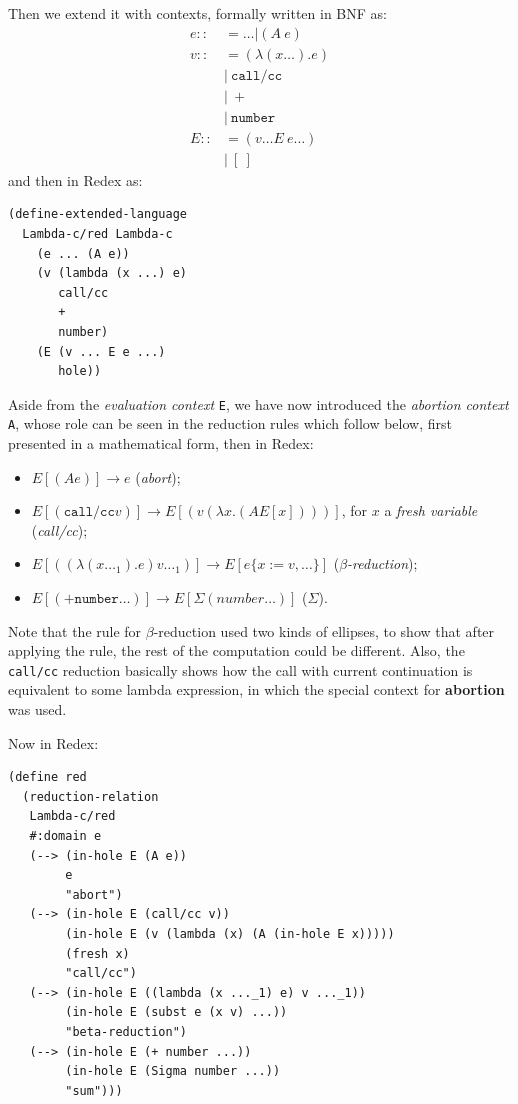Then we extend it with contexts, formally written in BNF as:
\begin{align*}
  e ::&= \dots | (A \ e) \\
  v ::&= (\lambda (x \dots). e) \\
      &| \ \texttt{call/cc} \\
      &| \ + \\
      &| \ \texttt{number} \\
  E ::&= (v \dots E \ e \dots) \\
      &| \ [ \ ]
\end{align*}
and then in Redex as:
{
  \small
\begin{verbatim}
(define-extended-language
  Lambda-c/red Lambda-c
    (e ... (A e))
    (v (lambda (x ...) e)
       call/cc
       +
       number)
    (E (v ... E e ...)
       hole))
\end{verbatim}
}
Aside from the \emph{evaluation context} \texttt{E}, we have now introduced the
\emph{abortion context} \texttt{A}, whose role can be seen in the reduction rules
which follow below, first presented in a mathematical form, then in Redex:
\begin{itemize}
\item $ E[(A e)] \to e $ (\emph{abort});
\item $ E[(\texttt{call/cc} v)] \to E[(v (\lambda x . (A E[x])))] $,
  for $ x $ a \emph{fresh variable} (\emph{call/cc});
\item $ E[((\lambda (x \dots_1).e)v \dots_1)] \to E[e \{ x := v, \dots \}] $
  (\emph{$\beta$-reduction});
\item $ E[(+ \texttt{number} \dots)] \to E[\Sigma (number \dots)] $ ($\Sigma$).
\end{itemize}
Note that the rule for $ \beta $-reduction used two kinds of ellipses, to show
that after applying the rule, the rest of the computation could be different.
Also, the \texttt{call/cc} reduction basically shows how the call with current
continuation is equivalent to some lambda expression, in which the special context
for {\color{red} \textbf{abortion}} was used.

Now in Redex:
{
  \small
\begin{verbatim}
(define red
  (reduction-relation
   Lambda-c/red
   #:domain e
   (--> (in-hole E (A e))
        e
        "abort")
   (--> (in-hole E (call/cc v))
        (in-hole E (v (lambda (x) (A (in-hole E x)))))
        (fresh x)
        "call/cc")
   (--> (in-hole E ((lambda (x ..._1) e) v ..._1))
        (in-hole E (subst e (x v) ...))
        "beta-reduction")
   (--> (in-hole E (+ number ...))
        (in-hole E (Sigma number ...))
        "sum")))
\end{verbatim}
}

